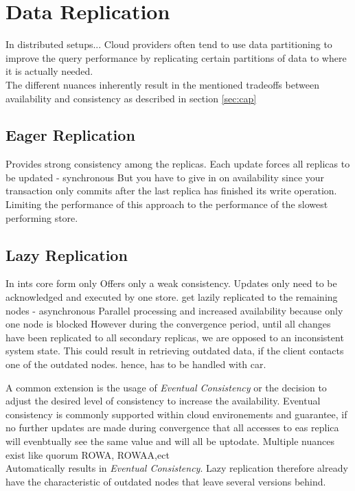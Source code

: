 \section{Data Replication}
In distributed setups...
Cloud providers often tend to use data partitioning to improve the query performance
by replicating certain partitions of data to where it is actually needed\cite{cloudpart_2012}.\\

The different nuances inherently result in the mentioned tradeoffs between availability and consistency as described in section \ref{sec:cap}

\subsection{Eager Replication}
Provides strong consistency among the replicas.
Each update forces all replicas to be updated - synchronous
But you have to give in on availability
since  your transaction only commits after the last replica has finished its write operation. Limiting the performance of this approach to 
the performance of the slowest performing store.

\subsection{Lazy Replication}
In ints core form only Offers only a weak consistency.
Updates only need to be acknowledged and executed by one store. get lazily replicated to the remaining nodes - asynchronous  
Parallel processing and increased availability because only one node is blocked
However during the convergence period, until all changes have been replicated to all secondary replicas, we are opposed to an inconsistent system state.
This could result in retrieving outdated data, if the client contacts one of the outdated nodes.
hence,  has to be handled with car.

A common extension  is the usage of \emph{Eventual Consistency}
or the decision to adjust the desired level of consistency to increase the availability. 
Eventual consistency is commonly supported within cloud environements and guarantee, if no further updates are made 
during convergence that all accesses to eas replica will evenbtually see the same value and will all be uptodate. 
Multiple nuances exist like quorum ROWA, ROWAA,ect 
\\
Automatically results in \emph{Eventual Consistency}. Lazy replication therefore already have the characteristic of outdated nodes that leave several versions behind.

